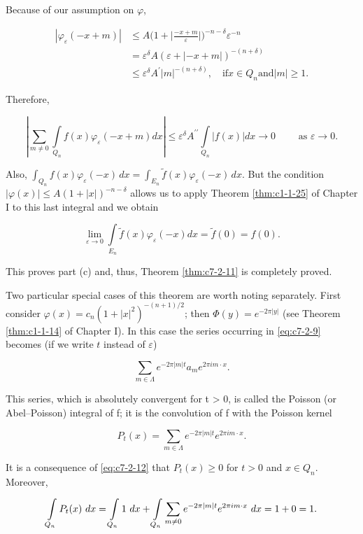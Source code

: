 Because of our assumption on $\varphi$,

\[
\begin{aligned}|\varphi_{\varepsilon}(-x+m)|&\leq A\bigg(1+\bigg|\frac{-x+m}{\varepsilon}\bigg|\bigg)^{-n-\delta}\varepsilon^{-n}\\&=\varepsilon^{\delta}A(\varepsilon+|-x+m|)^{-(n+\delta)}\\&\leq\varepsilon^{\delta}A^{\prime}|m|^{-(n+\delta)},\quad\text{if}x\in Q_{n}\text{and}|m|\geq1.\end{aligned}
\]

Therefore,

\[
\left|\sum_{m\neq0}\int\limits_{Q_{n}}f(x)\varphi_{\varepsilon}(-x+m)d x\right|\leq\varepsilon^{\delta}A^{\prime \prime}\int\limits_{Q_{n}}\left|f(x)\right|d x\rightarrow0\qquad\text{ as }\varepsilon\rightarrow0.
\]

Also, $\int_{Q_n} f(x)\varphi_\varepsilon(-x)\,dx = \int_{E_n} \tilde{f}(x)\varphi_\varepsilon(-x)\,dx$. But the condition $|\varphi(x)| \leq A(1 + |x|)^{-n-\delta}$ allows us to apply Theorem \ref{thm:c1-1-25} of Chapter I to this last integral and we obtain

\[
\lim_{\varepsilon\to0}\int\limits_{E_{n}}\tilde{f}(x)\varphi_{\varepsilon}(-x)d x=\tilde{f}(0)=f(0).
\]

This proves part (c) and, thus, Theorem \ref{thm:c7-2-11} is completely proved.

Two particular special cases of this theorem are worth noting separately. First consider $\varphi(x) = c_n(1 + |x|^2)^{-(n+1)/2}$; then $\Phi(y) = e^{-2\pi|y|}$ (see Theorem \ref{thm:c1-1-14} of Chapter I). In this case the series occurring in \eqref{eq:c7-2-9} becomes (if we write $t$ instead of $\varepsilon$)

\begin{equation}\label{eq:c7-2-13}
\sum_{m\in\Lambda}e^{-2\pi\left|m\right|t}a_{m}e^{2\pi i m\cdot x}.
\end{equation}

This series, which is absolutely convergent for t > 0, is called the Poisson (or Abel--Poisson) integral of f; it is the convolution of f with the Poisson kernel

\[
P_{t}(x)=\sum_{m\in\Lambda}e^{-2\pi|m|t}e^{2\pi i m\cdot x}.
\]

It is a consequence of \eqref{eq:c7-2-12} that $P_t(x) \geq 0$ for $t > 0$ and $x \in Q_n$. Moreover,

\[
\intop_{Q_{n}}P_{t}(x)\mathop{}{d}x=\intop_{Q_{n}}1\mathop{}{d}x+\intop_{Q_{n}}\sum_{m\neq0}e^{-2\pi|m|t}e^{2\pi i m\cdot x}\mathop{}{d}x=1+0=1.
\]

